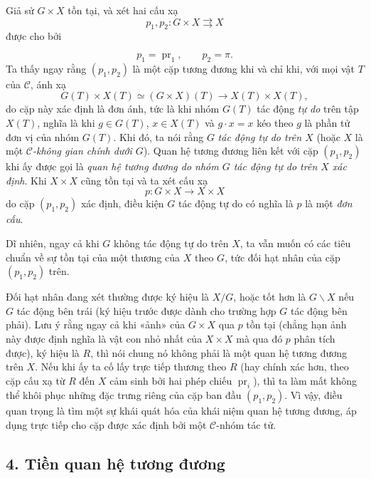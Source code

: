 \documentclass[11pt,twoside,openany]{book}
\numberwithin{equation}{section}
\newcommand{\src}[1]{%
  \phantomsection\hypertarget{src:\fgasourceid:#1}{}%
  \marginpar{\raggedleft\footnotesize\sffamily #1}%
}
\newcommand{\fgasourceid}{unset}
\begin{document}
Giả sử $G\times X$ tồn tại, và xét hai cấu xạ
\[
  p_1,p_2:G\times X\rightrightarrows X
\]
được cho bởi

\src{105}
\[
  p_1=\operatorname{pr}_1,\qquad p_2=\pi.
\]
Ta thấy ngay rằng $(p_1,p_2)$ là một cặp tương đương khi và chỉ khi, với mọi
vật $T$ của $\mathcal C$, ánh xạ
\[
  G(T)\times X(T)\simeq(G\times X)(T)
  \longrightarrow X(T)\times X(T),
\]
do cặp này xác định là đơn ánh, tức là khi nhóm $G(T)$ tác động
\emph{tự do} trên tập $X(T)$, nghĩa là khi $g\in G(T)$, $x\in X(T)$ và
$g\cdot x=x$ kéo theo $g$ là phần tử đơn vị của nhóm $G(T)$. Khi đó, ta nói
rằng $G$ \emph{tác động tự do trên $X$} (hoặc $X$ là một
\emph{$\mathcal C$-không gian chính dưới $G$}). Quan hệ tương đương liên kết
với cặp $(p_1,p_2)$ khi ấy được gọi là \emph{quan hệ tương đương do nhóm $G$
tác động tự do trên $X$ xác định}. Khi $X\times X$ cũng tồn tại và ta xét cấu
xạ
\[
  p:G\times X\longrightarrow X\times X
\]
do cặp $(p_1,p_2)$ xác định, điều kiện $G$ tác động tự do có nghĩa là $p$ là
một \emph{đơn cấu}.

Dĩ nhiên, ngay cả khi $G$ không tác động tự do trên $X$, ta vẫn muốn có các
tiêu chuẩn về sự tồn tại của một thương của $X$ theo $G$, tức đối hạt nhân của
cặp $(p_1,p_2)$ trên.

Đối hạt nhân đang xét thường được ký hiệu là $X/G$, hoặc tốt hơn là
$G\backslash X$ nếu $G$ tác động bên trái (ký hiệu trước được dành cho trường
hợp $G$ tác động bên phải). Lưu ý rằng ngay cả khi «ảnh» của $G\times X$ qua
$p$ tồn tại (chẳng hạn ảnh này được định nghĩa là vật con nhỏ nhất của
$X\times X$ mà qua đó $p$ phân tích được), ký hiệu là $R$, thì nói chung nó
không phải là một quan hệ tương đương trên $X$. Nếu khi ấy ta cố lấy trực tiếp
thương theo $R$ (hay chính xác hơn, theo cặp cấu xạ từ $R$ đến $X$ cảm sinh bởi
hai phép chiếu $\operatorname{pr}_i$), thì ta làm mất không thể khôi phục
những đặc trưng riêng của cặp ban đầu $(p_1,p_2)$. Vì vậy, điều quan trọng là
tìm một sự khái quát hóa của khái niệm quan hệ tương đương, áp dụng trực tiếp
cho cặp được xác định bởi một $\mathcal C$-nhóm tác tử.

\subsection*{4. Tiền quan hệ tương đương}
\end{document}
